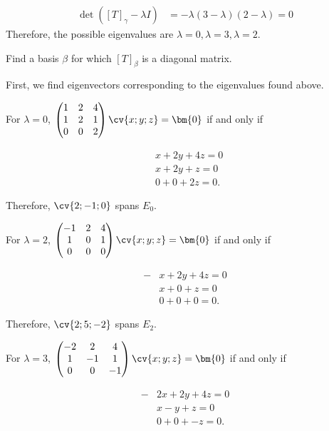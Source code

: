 \documentclass[11pt]{scrartcl}
\begin{document}
\begin{linenumbers}
\begin{soln}
    \begin{align}
      \det([T]_{\gamma}-\lambda I) & = -\lambda(3-\lambda)(2-\lambda) = 0
    \end{align}
    Therefore, the possible eigenvalues are
    $\lambda=0, \lambda = 3, \lambda = 2$.
  \end{soln}
  \begin{problem*}
    Find a basis $\beta$ for which $[T]_{\beta}$ is a diagonal matrix.
  \end{problem*}
  \begin{soln}
    First, we find eigenvectors corresponding to the eigenvalues found
    above.

    For $\lambda=0$, $
    \begin{pmatrix}
      1 & 2 & 4 \\
      1 & 2 & 1 \\
      0 & 0 & 2
    \end{pmatrix}\cv{x; y; z} = \bm{0}$ if and only if

    \begin{align}
      & x + 2y + 4z = 0 \\
      & x + 2y + z = 0  \\
      & 0 + 0 + 2z = 0.
    \end{align}

    Therefore, $\cv{2; -1; 0}$ spans $E_0$.

    For $\lambda=2$, $
    \begin{pmatrix}
      -1 & 2 & 4 \\
      1 & 0 & 1 \\
      0 & 0 & 0
    \end{pmatrix}\cv{x; y; z} = \bm{0}$ if and only if

    \begin{align}
      -& x + 2y + 4z = 0 \\
       & x  + 0 + z = 0     \\
       & 0 + 0 + 0 = 0.
    \end{align}

    Therefore, $\cv{2; 5; -2}$ spans $E_2$.

    For $\lambda=3$, $
    \begin{pmatrix}
      -2 & 2 & 4 \\
      1 & -1 & 1 \\
      0 & 0 & -1
    \end{pmatrix}\cv{x; y; z} = \bm{0}$ if and only if

    \begin{align}
      -& 2x + 2y + 4z = 0 \\
      & x - y + z = 0     \\
      & 0 + 0 + -z = 0.
    \end{align}


\end{soln}
\end{linenumbers}
\end{document}
